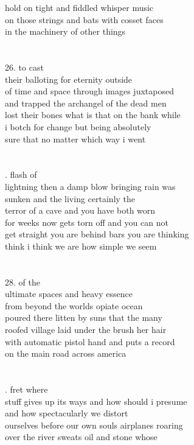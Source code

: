 \documentclass{article}
\begin{document}
hold on tight and fiddled whisper music\\
on those strings and bats with cosset faces\\
in the machinery of other things\\
\\
\\
26. to cast\\
their balloting for eternity outside\\
of time and space through images juxtaposed\\
and trapped the archangel of the dead men\\
lost their bones what is that on the bank while\\
i botch for change but being absolutely\\
sure that no matter which way i went\\
\\
\\
\newpage
{}. flash of\\
lightning then a damp blow bringing rain was\\
sunken and the living certainly the\\
terror of a cave and you have both worn\\
for weeks now gets torn off and you can not\\
get straight you are behind bars you are thinking\\
think i think we are how simple we seem\\
\\
\\
28. of the\\
ultimate spaces and heavy essence\\
from beyond the worlds opiate ocean\\
poured there litten by suns that the many\\
roofed village laid under the brush her hair\\
with automatic pistol hand and puts a record\\
on the main road across america\\
\\
\\
\newpage
{}. fret where\\
stuff gives up its ways and how should i presume\\
and how spectacularly we distort\\
ourselves before our own souls airplanes roaring\\
over the river sweats oil and stone whose\\
\end{document}
